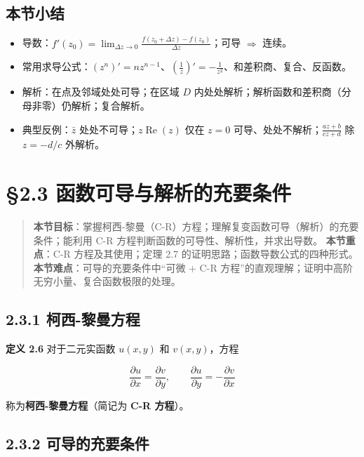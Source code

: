 \subsection{本节小结}\label{ux672cux8282ux5c0fux7ed3-4}

\begin{itemize}
\tightlist
\item
  导数：\(\displaystyle f'(z_0)=\lim_{\Delta z\to0}\frac{f(z_0+\Delta z)-f(z_0)}{\Delta z}\)；可导
  \(\Rightarrow\) 连续。
\item
  常用求导公式：\(\left(z^n\right)'=nz^{n-1}\)、\(\left(\frac{1}{z}\right)'=-\frac{1}{z^2}\)、和差积商、复合、反函数。
\item
  解析：在点及邻域处处可导；在区域 \(D\)
  内处处解析；解析函数和差积商（分母非零）仍解析；复合解析。
\item
  典型反例：\(\bar z\) 处处不可导；\(z\operatorname{Re}(z)\) 仅在
  \(z=0\) 可导、处处不解析；\(\frac{az+b}{cz+d}\) 除 \(z=-d/c\) 外解析。
\end{itemize}

\section{§2.3
函数可导与解析的充要条件}\label{ux51fdux6570ux53efux5bfcux4e0eux89e3ux6790ux7684ux5145ux8981ux6761ux4ef6}

\begin{quote}
\textbf{本节目标}：掌握柯西-黎曼（C-R）方程；理解复变函数可导（解析）的充要条件；能利用
C-R 方程判断函数的可导性、解析性，并求出导数。 \textbf{本节重点}：C-R
方程及其使用；定理 2.7 的证明思路；函数导数公式的四种形式。
\textbf{本节难点}：可导的充要条件中``可微 + C-R
方程''的直观理解；证明中高阶无穷小量、复合函数极限的处理。
\end{quote}

\subsection{2.3.1
柯西-黎曼方程}\label{ux67efux897f-ux9eceux66fcux65b9ux7a0b}

\textbf{定义 2.6} 对于二元实函数 \(u(x,y)\) 和 \(v(x,y)\)，方程

\[
\frac{\partial u}{\partial x}=\frac{\partial v}{\partial y},\qquad
\frac{\partial u}{\partial y}=-\frac{\partial v}{\partial x}
\]

称为\textbf{柯西-黎曼方程}（简记为 \textbf{C-R 方程}）。

\subsection{2.3.2
可导的充要条件}\label{ux53efux5bfcux7684ux5145ux8981ux6761ux4ef6}

